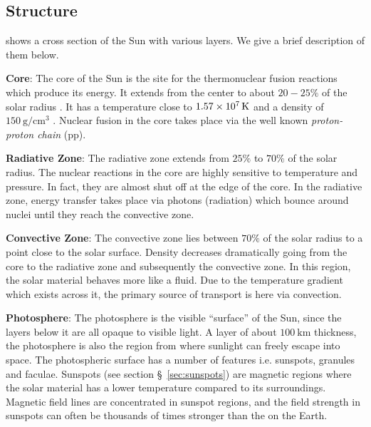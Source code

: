 \subsection{Structure}

 shows a cross section of the Sun with various layers. We give a brief 
description of them below.

\textbf{Core}: The core of the Sun is the site for the thermonuclear fusion reactions which produce 
its energy. It extends from the center to about $20-25\%$ of the solar radius \citep{SolarAct}. It 
has a temperature close to $\SI{1.57d7}{\kelvin}$ and a density of 
$\SI{150}{\gram\per\centi\metre^3}$ \citep{SolarCore}. Nuclear fusion in the core takes place via 
the well known \emph{proton-proton chain} (pp).

\textbf{Radiative Zone}: The radiative zone extends from $25\%$ to $70\%$ of the solar radius. 
The nuclear reactions in the core are highly sensitive to temperature and pressure. In fact, they 
are almost shut off at the edge of the core. In the radiative zone, energy transfer takes place via 
photons (radiation) which bounce around nuclei until they reach the convective zone.

\textbf{Convective Zone}: The convective zone lies between $70\%$ of the solar radius to a point 
close to the solar surface. Density decreases dramatically going from the core to the radiative 
zone and subsequently the convective zone. In this region, the solar material behaves more like a 
fluid. Due to the temperature gradient which exists across it, the primary source of transport is 
here via convection.

\textbf{Photosphere}: The photosphere is the visible \enquote{surface} of the Sun, since the layers 
below it are all opaque to visible light. A layer of about $\SI{100}{\kilo\metre}$ thickness, the 
photosphere is also the region from where sunlight can freely escape into space. The photospheric 
surface has a number of features i.e. sunspots, granules and faculae. Sunspots (see section 
\S~\ref{sec:sunspots}) are magnetic regions where the solar material has a lower temperature 
compared to its surroundings. Magnetic field lines are concentrated in sunspot regions, and the 
field strength in sunspots can often be thousands of times stronger than the on the Earth.


